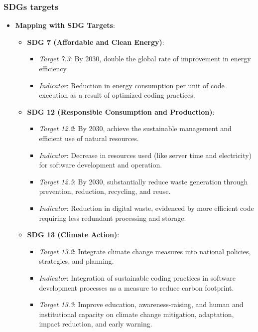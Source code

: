 \documentclass[conference,compsoc]{IEEEtran}
\begin{document}
\subsubsection{SDGs targets}
\begin{itemize}
    \item \textbf{Mapping with SDG Targets}:
    \begin{itemize}
        \item \textbf{SDG 7 (Affordable and Clean Energy)}:
            \begin{itemize}
                \item \textit{Target 7.3}: By 2030, double the global rate of improvement in energy efficiency.
                \item \textit{Indicator}: Reduction in energy consumption per unit of code execution as a result of optimized coding practices.
            \end{itemize}
        \item \textbf{SDG 12 (Responsible Consumption and Production)}:
            \begin{itemize}
                \item \textit{Target 12.2}: By 2030, achieve the sustainable management and efficient use of natural resources.
                \item \textit{Indicator}: Decrease in resources used (like server time and electricity) for software development and operation.
                \item \textit{Target 12.5}: By 2030, substantially reduce waste generation through prevention, reduction, recycling, and reuse.
                \item \textit{Indicator}: Reduction in digital waste, evidenced by more efficient code requiring less redundant processing and storage.
            \end{itemize}
        \item \textbf{SDG 13 (Climate Action)}:
            \begin{itemize}
                \item \textit{Target 13.2}: Integrate climate change measures into national policies, strategies, and planning.
                \item \textit{Indicator}: Integration of sustainable coding practices in software development processes as a measure to reduce carbon footprint.
                \item \textit{Target 13.3}: Improve education, awareness-raising, and human and institutional capacity on climate change mitigation, adaptation, impact reduction, and early warning.

\end{itemize}
\end{itemize}
\end{itemize}
\end{document}
